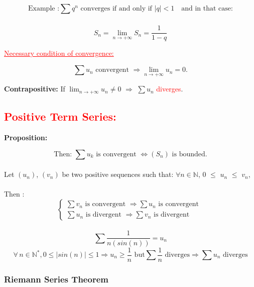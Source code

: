 \documentclass[a4paper,12pt]{article}
\begin{document}
\[ \text{Example :} \sum_ {} {q^n} \text{ converges if and only if } |q| < 1 \quad \text{and in that case:}
\]

\[
S_n = \lim_{n \to +\infty} S_n = \frac{1}{1-q}
\]


\textcolor{red}{\underline{Necessary condition of convergence:}}

\[
\sum u_n \text{ convergent } \Rightarrow \lim_{n \to +\infty} u_n = 0.
\]

\begin{tcolorbox}[colback=red!5!white,colframe=red!75!black]
\textbf{Contrapositive:}  
If $\lim_{n \to +\infty} u_n \neq  0$ $\Rightarrow$ $\sum u_n$ \textcolor{red}{diverges}.
\end{tcolorbox}

\textcolor{red}{\subsection*{Positive Term Series:}}\bigskip

\bigskip

\textbf{Proposition:}  

\[
\text{Then: } \sum u_k \text{ is convergent } \Leftrightarrow (S_n) \text{ is bounded}.
\]
\\
Let $(u_n)$, $(v_n)$ be two positive sequences such that: $\forall {n} \in \mathbb{N}$, 0 $\leq$ $u_n$ $\leq$ $v_n$,\\
\\ Then :
\[
\begin{cases}

\sum v_n \text{ is convergent } \Rightarrow \sum u_n \text{ is convergent } \\[6pt]

\sum u_n \text{ is divergent } \Rightarrow \sum v_n \text{ is divergent }

\end{cases}
\]
 \\
\[
\sum \frac{1}{n(sin(n))} = u_n
\]
\bigskip
\[
\forall \, n \in \mathbb{N^*}, 0 \leq |sin(n)| \leq 1 \Rightarrow u_n \ge \frac{1}{n} \text{ but} \sum \frac{1}{n} \text{ diverges} \Rightarrow \sum u_n \text{ diverges}
\]
\bigskip
\subsubsection*{Riemann Series Theorem}
\end{document}
